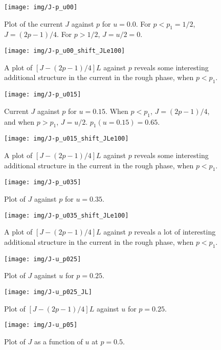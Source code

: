 \documentclass[a4paper,10pt]{article}
\begin{document}
\begin{figure}
 \centering
 \texttt{[image: img/J-p\_u00]}
 \caption{Plot of the current $J$ against $p$ for $u=0.0$. For $p < p_1 = 1/2$, $J =(2p-1)/4$. For $p>1/2$, $J = u/2 = 0$.}
 \label{fig:J-p_u00}
\end{figure}
\begin{figure}
 \centering
 \texttt{[image: img/J-p\_u00\_shift\_JLe100]}
 \caption{A plot of $[J-(2p-1)/4]L$ against $p$ reveals some interesting additional structure in the current in the rough phase, when $p < p_1$.}
 \label{fig:J-p_u00_shift}
\end{figure}
\begin{figure}
 \centering
 \texttt{[image: img/J-p\_u015]}
 \caption{Current $J$ against $p$ for $u=0.15$. When $p < p_1$, $J = (2p-1)/4$, and when $p > p_1$, $J = u/2$. $p_1(u=0.15) = 0.65$.}
 \label{fig:J-p_u015}
\end{figure}
\begin{figure}
 \centering
 \texttt{[image: img/J-p\_u015\_shift\_JLe100]}
 \caption{A plot of $[J-(2p-1)/4]L$ against $p$ reveals some interesting additional structure in the current in the rough phase, when $p < p_1$.}
 \label{fig:J-p_u015_shift}
\end{figure}
\begin{figure}
 \centering
 \texttt{[image: img/J-p\_u035]}
 \caption{Plot of $J$ against $p$ for $u = 0.35$.}
 \label{fig:J-p_u035}
\end{figure}
\begin{figure}
 \centering
 \texttt{[image: img/J-p\_u035\_shift\_JLe100]}
 \caption{A plot of $[J-(2p-1)/4]L$ against $p$ reveals a lot of interesting additional structure in the current in the rough phase, when $p < p_1$.}
 \label{fig:J-p_u035_shift}
\end{figure}
\begin{figure}
 \centering
 \texttt{[image: img/J-u\_p025]}
 \caption{Plot of $J$ against $u$ for $p = 0.25.$}
 \label{fig:J-u_p025}
\end{figure}
\begin{figure}
 \centering
 \texttt{[image: img/J-u\_p025\_JL]}
 \caption{Plot of $[J - (2p-1)/4]L$ against $u$ for $p = 0.25$.}
 \label{fig:J-u_p025_JL}
\end{figure}
\begin{figure}
 \centering
 \texttt{[image: img/J-u\_p05]}
 \caption{Plot of $J$ as a function of $u$ at $p = 0.5$.}
 \label{fig:J-u_p05}
\end{figure}
\end{document}

